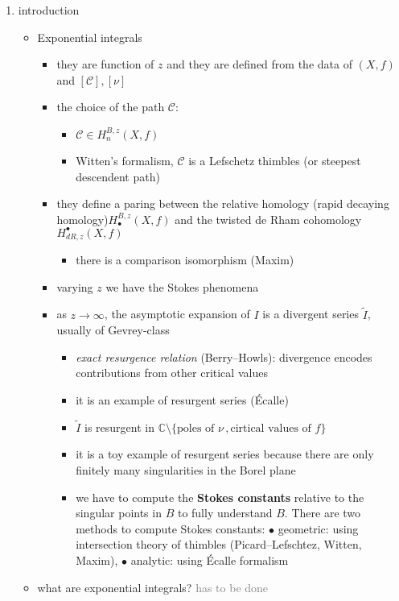\documentclass{article}
\newcommand{\C}{\mathbb{C}}
\begin{document}
\begin{enumerate}
\item introduction
\begin{itemize}
\item Exponential integrals
\begin{itemize}
\item they are function of $z$ and they are defined from the data of $(X,f)$ and $[\mathcal{C}], [\nu]$
\item the choice of the path $\mathcal{C}$: 
\begin{itemize}
\item $\mathcal{C}\in H^{B,z}_{n}(X,f)$
\item Witten's formalism, $\mathcal{C}$ is a Lefschetz thimbles (or steepest descendent path)
\end{itemize}
\item they define a paring between the relative homology (rapid decaying homology)$H^{B,z}_{\bullet}(X,f)$ and the twisted de Rham cohomology  $H_{dR,z}^{\bullet}(X,f)$
\begin{itemize}
\item there is a comparison isomorphism (Maxim)
\end{itemize}
\item varying $z$ we have the Stokes phenomena
\item as $z\to\infty$, the asymptotic expansion of $I$ is a divergent series $\tilde{I}$, usually of Gevrey-class
\begin{itemize}
\item {\it exact resurgence relation} (Berry--Howls): divergence encodes contributions from other critical values
\item it is an example of resurgent series (\'Ecalle)
\item $\tilde{I}$ is resurgent in $\C\setminus\lbrace \text{poles of } \nu\,, \text{cirtical values of } f\rbrace$
\item it is a toy example of resurgent series because there are only finitely many singularities in the Borel plane
\item we have to compute the \textbf{Stokes constants} relative to the singular points in $B$ to fully understand $B$. There are two methods to compute Stokes constants: $\bullet$ geometric: using intersection theory of thimbles (Picard--Lefschtez, Witten, Maxim), $\bullet$ analytic: using \'Ecalle formalism   
\end{itemize} 
\end{itemize}
\item what are exponential integrals? \textcolor{gray}{has to be done}

\end{itemize}
\end{enumerate}
\end{document}
